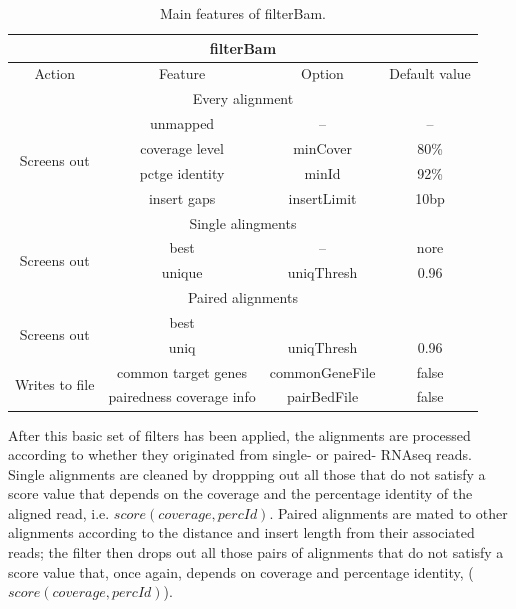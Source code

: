 \documentclass[11pt]{article}
\begin{document}
{\begin{table}
  \begin{center}
    \begin{tabular} {|c|c|c|c|} \hline
	 \multicolumn{4}{|c|}{\textbf{filterBam}} \\ \hline
      Action & Feature & Option & Default value \\ \hline 
      \multicolumn{4}{|c|}{Every alignment} \\ \hline
      \multirow{4}{*}{Screens out} & unmapped & -- &  -- \\ \cline{2-4}
      & coverage level & minCover & 80\% \\  \cline{2-4}
      & pctge identity & minId & 92\%\\  \cline{2-4}
      & insert gaps & insertLimit & 10bp\\ \hline
      \multicolumn{4}{|c|}{Single alingments} \\ \hline
      \multirow{2}{*}{Screens out} & best & -- & nore \\ \cline{2-4}
      & unique & uniqThresh & 0.96 \\ \hline
      \multicolumn{4}{|c|}{Paired alignments} \\ \hline
      \multirow{2}{*}{Screens out} & best & & \\  \cline{2-4}
      & uniq & uniqThresh & 0.96 \\ \hline
      \multirow{2}{*}{Writes to file} & common target genes & commonGeneFile & false \\  \cline{2-4} 
      & pairedness coverage info & pairBedFile & false \\ \hline
    \end{tabular}
    \caption{Main features of filterBam.}
    \label{tab:featuresFilter}
  \end{center}
\end{table}

After this basic set of filters has been applied, the alignments are processed according to whether they 
originated from single- or paired- RNAseq reads. Single alignments are cleaned by droppping out all those 
that do not satisfy a score value that depends on the coverage and the percentage identity of the aligned read,
i.e. $score(coverage, percId)$. Paired alignments are mated to other alignments according to the distance and 
insert length from their associated reads; the filter then drops out all those pairs of alignments that do 
not satisfy a score value that, once again, depends on coverage and percentage identity, ($score(coverage, percId)$).
 
}
\end{document}

